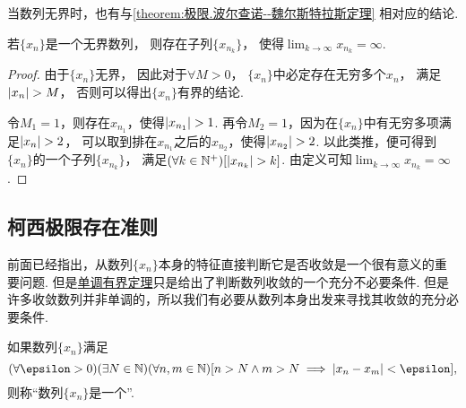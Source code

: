 当数列无界时，也有与\cref{theorem:极限.波尔查诺--魏尔斯特拉斯定理} 相对应的结论.
\begin{theorem}
若\(\{x_n\}\)是一个无界数列，
则存在子列\(\{x_{n_k}\}\)，
使得\(\lim_{k\to\infty} x_{n_k} = \infty\).
\begin{proof}
由于\(\{x_n\}\)无界，
因此对于\(\forall M>0\)，
\(\{x_n\}\)中必定存在无穷多个\(x_n\)，
满足\(\abs{x_n}>M\)，
否则可以得出\(\{x_n\}\)有界的结论.

令\(M_1=1\)，则存在\(x_{n_1}\)，使得\(\abs{x_{n_1}}>1\).
再令\(M_2=1\)，因为在\(\{x_n\}\)中有无穷多项满足\(\abs{x_n}>2\)，
可以取到排在\(x_{n_1}\)之后的\(x_{n_2}\)，使得\(\abs{x_{n_2}}>2\).
以此类推，便可得到\(\{x_n\}\)的一个子列\(\{x_{n_k}\}\)，
满足\((\forall k\in\mathbb{N}^+)[\abs{x_{n_k}}>k]\).
由定义可知\(\lim_{k\to\infty} x_{n_k} = \infty\).
\end{proof}
\end{theorem}

\subsection{柯西极限存在准则}
前面已经指出，从数列\(\{x_n\}\)本身的特征直接判断它是否收敛是一个很有意义的重要问题.
但是\hyperref[theorem:极限.数列的单调有界定理]{单调有界定理}只是给出了判断数列收敛的一个充分不必要条件.
但是许多收敛数列并非单调的，所以我们有必要从数列本身出发来寻找其收敛的充分必要条件.

\begin{definition}
如果数列\(\{x_n\}\)满足\[
	(\forall\epsilon>0)
	(\exists N\in\mathbb{N})
	(\forall n,m\in\mathbb{N})
	[n > N \land m > N \implies \abs{x_n - x_m} < \epsilon],
\]
则称“数列\(\{x_n\}\)是一个”.
\end{definition}

